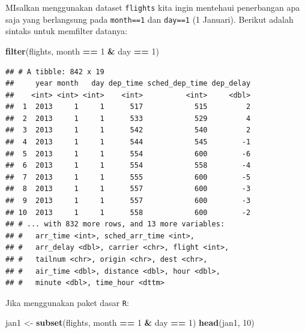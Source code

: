\documentclass[]{book}
\newenvironment{Shaded}{\begin{snugshade}}{\end{snugshade}}
\newcommand{\KeywordTok}[1]{\textcolor[rgb]{0.13,0.29,0.53}{\textbf{#1}}}
\newcommand{\DecValTok}[1]{\textcolor[rgb]{0.00,0.00,0.81}{#1}}
\newcommand{\StringTok}[1]{\textcolor[rgb]{0.31,0.60,0.02}{#1}}
\newcommand{\OperatorTok}[1]{\textcolor[rgb]{0.81,0.36,0.00}{\textbf{#1}}}
\newcommand{\NormalTok}[1]{#1}
\begin{document}
MIsalkan menggunakan dataset \texttt{flights} kita ingin mentehaui
penerbangan apa saja yang berlangsung pada \texttt{month==1} dan
\texttt{day==1} (1 Januari). Berikut adalah sintaks untuk memfilter
datanya:

\begin{Shaded}
\begin{Highlighting}[]
\KeywordTok{filter}\NormalTok{(flights, month }\OperatorTok{==}\StringTok{ }\DecValTok{1} \OperatorTok{&}\StringTok{ }\NormalTok{day }\OperatorTok{==}\StringTok{ }\DecValTok{1}\NormalTok{)}
\end{Highlighting}
\end{Shaded}

\begin{verbatim}
## # A tibble: 842 x 19
##     year month   day dep_time sched_dep_time dep_delay
##    <int> <int> <int>    <int>          <int>     <dbl>
##  1  2013     1     1      517            515         2
##  2  2013     1     1      533            529         4
##  3  2013     1     1      542            540         2
##  4  2013     1     1      544            545        -1
##  5  2013     1     1      554            600        -6
##  6  2013     1     1      554            558        -4
##  7  2013     1     1      555            600        -5
##  8  2013     1     1      557            600        -3
##  9  2013     1     1      557            600        -3
## 10  2013     1     1      558            600        -2
## # ... with 832 more rows, and 13 more variables:
## #   arr_time <int>, sched_arr_time <int>,
## #   arr_delay <dbl>, carrier <chr>, flight <int>,
## #   tailnum <chr>, origin <chr>, dest <chr>,
## #   air_time <dbl>, distance <dbl>, hour <dbl>,
## #   minute <dbl>, time_hour <dttm>
\end{verbatim}

Jika menggunakan paket dasar \texttt{R}:

\begin{Shaded}
\begin{Highlighting}[]
\NormalTok{jan1 <-}\StringTok{ }\KeywordTok{subset}\NormalTok{(flights, month }\OperatorTok{==}\StringTok{ }\DecValTok{1} \OperatorTok{&}\StringTok{ }\NormalTok{day }\OperatorTok{==}\StringTok{ }\DecValTok{1}\NormalTok{)}
\KeywordTok{head}\NormalTok{(jan1, }\DecValTok{10}\NormalTok{)}
\end{Highlighting}
\end{Shaded}
\end{document}
